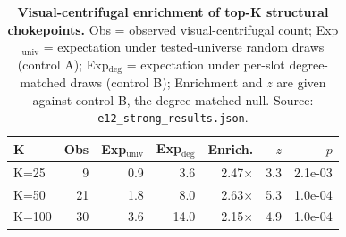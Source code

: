 \begin{table}[htbp]
\centering
\small
\caption{\textbf{Visual-centrifugal enrichment of top-K structural chokepoints.} Obs = observed visual-centrifugal count; Exp$_{\mathrm{univ}}$ = expectation under tested-universe random draws (control A); Exp$_{\mathrm{deg}}$ = expectation under per-slot degree-matched draws (control B); Enrichment and $z$ are given against control B, the degree-matched null. Source: \texttt{e12\_strong\_results.json}.}\label{tab:vc}
\begin{tabular}{lrrrrrr}
\hline
K & Obs & Exp$_{\mathrm{univ}}$ & Exp$_{\mathrm{deg}}$ & Enrich. & $z$ & $p$ \\
\hline
K=25 & 9 & 0.9 & 3.6 & 2.47$\times$ & 3.3 & 2.1e-03 \\
K=50 & 21 & 1.8 & 8.0 & 2.63$\times$ & 5.3 & 1.0e-04 \\
K=100 & 30 & 3.6 & 14.0 & 2.15$\times$ & 4.9 & 1.0e-04 \\
\hline
\end{tabular}
\end{table}
